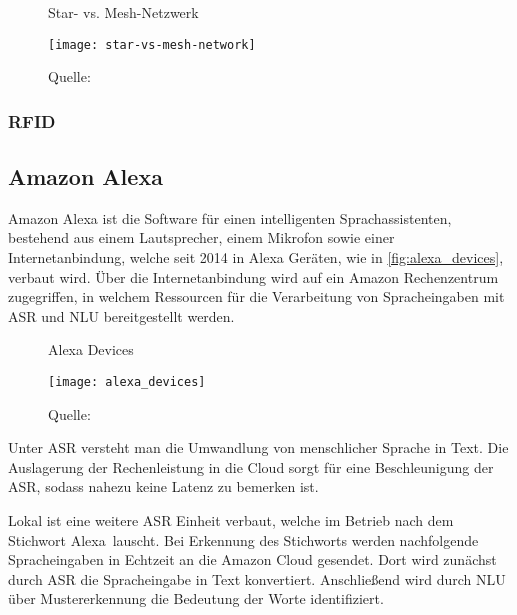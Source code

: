 \begin{figure}[ht]
	\centering
	\caption{Star- vs. Mesh-Netzwerk}
	\texttt{[image: star-vs-mesh-network]}
	\caption*{\footnotesize{Quelle: }}
	\label{fig:star_vs_mesh_network}
\end{figure}


\subsubsection{RFID}


\subsection{Amazon Alexa}

Amazon Alexa ist die Software für einen intelligenten Sprachassistenten, bestehend aus einem Lautsprecher, einem Mikrofon sowie einer Internetanbindung, welche seit 2014 in Alexa Geräten, wie in \autoref{fig:alexa_devices}, verbaut wird.
Über die Internetanbindung wird auf ein Amazon Rechenzentrum zugegriffen, in welchem Ressourcen für die Verarbeitung von Spracheingaben mit \ac{ASR} und \ac{NLU} bereitgestellt werden.

\begin{figure}[ht]
	\centering
	\caption{Alexa Devices}
	\texttt{[image: alexa\_devices]}
	\caption*{\footnotesize{Quelle: }}
	\label{fig:alexa_devices}
\end{figure}

Unter \ac{ASR} versteht man die Umwandlung von menschlicher Sprache in Text.
Die Auslagerung der Rechenleistung in die Cloud sorgt für eine Beschleunigung der \ac{ASR}, sodass nahezu keine Latenz zu bemerken ist.

Lokal ist eine weitere \ac{ASR} Einheit verbaut, welche im Betrieb nach dem Stichwort \glqq Alexa\grqq \ lauscht.
Bei Erkennung des Stichworts werden nachfolgende Spracheingaben in Echtzeit an die Amazon Cloud gesendet.
Dort wird zunächst durch \ac{ASR} die Spracheingabe in Text konvertiert.
Anschließend wird durch \ac{NLU} über Mustererkennung die Bedeutung der Worte identifiziert. 

